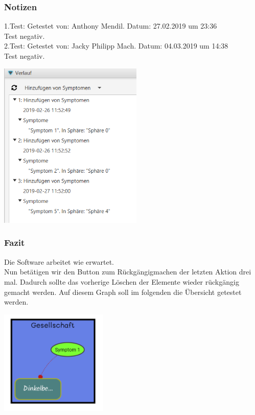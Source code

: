 \documentclass[enabledeprecatedfontcommands]{scrartcl}
\begin{document}
\subsubsection{Notizen}
1.Test: Getestet von: Anthony Mendil. Datum: 27.02.2019 um 23:36 \\
Test negativ. \\
2.Test: Getestet von: Jacky Philipp Mach. Datum: 04.03.2019 um 14:38 \\
Test negativ.
\begin{center}
\includegraphics[height=8cm]{verlaufUpdateButton.PNG}
\end{center}
\subsubsection{Fazit}
Die Software arbeitet wie erwartet.\\

Nun betätigen wir den Button zum Rückgängigmachen der letzten Aktion drei mal. Dadurch sollte das vorherige Löschen der Elemente wieder rückgängig gemacht werden. Auf diesem Graph soll im folgenden die Übersicht getestet werden.
\begin{center}
\includegraphics[height=5cm]{graphFuerUebersicht.PNG}
\end{center}
\end{document}
